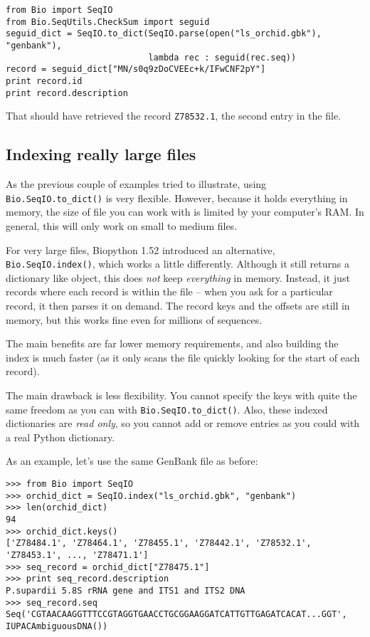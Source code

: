 \documentclass{report}
\begin{document}
\begin{verbatim}
from Bio import SeqIO
from Bio.SeqUtils.CheckSum import seguid
seguid_dict = SeqIO.to_dict(SeqIO.parse(open("ls_orchid.gbk"), "genbank"),
                            lambda rec : seguid(rec.seq))
record = seguid_dict["MN/s0q9zDoCVEEc+k/IFwCNF2pY"]
print record.id
print record.description
\end{verbatim}

\noindent That should have retrieved the record {\tt Z78532.1}, the second entry in the file.

\subsection{Indexing really large files}
\label{sec:seqio-index}

As the previous couple of examples tried to illustrate, using
\verb|Bio.SeqIO.to_dict()| is very flexible. However, because it holds
everything in memory, the size of file you can work with is limited by your
computer's RAM. In general, this will only work on small to medium files.

For very large files, Biopython 1.52 introduced an alternative,
\verb|Bio.SeqIO.index()|, which works a little differently. Although
it still returns a dictionary like object, this does \emph{not} keep
\emph{everything} in memory. Instead, it just records where each record
is within the file -- when you ask for a particular record, it then parses
it on demand. The record keys and the offsets are still in memory, but this
works fine even for millions of sequences.

The main benefits are far lower memory requirements, and also building
the index is much faster (as it only scans the file quickly looking for
the start of each record).

The main drawback is less flexibility. You cannot specify the keys with quite
the same freedom as you can with \verb|Bio.SeqIO.to_dict()|. Also, these
indexed dictionaries are \emph{read only}, so you cannot add or remove
entries as you could with a real Python dictionary.

As an example, let's use the same GenBank file as before:

\begin{verbatim}
>>> from Bio import SeqIO
>>> orchid_dict = SeqIO.index("ls_orchid.gbk", "genbank")
>>> len(orchid_dict)
94
>>> orchid_dict.keys()
['Z78484.1', 'Z78464.1', 'Z78455.1', 'Z78442.1', 'Z78532.1', 'Z78453.1', ..., 'Z78471.1']
>>> seq_record = orchid_dict["Z78475.1"]
>>> print seq_record.description
P.supardii 5.8S rRNA gene and ITS1 and ITS2 DNA
>>> seq_record.seq
Seq('CGTAACAAGGTTTCCGTAGGTGAACCTGCGGAAGGATCATTGTTGAGATCACAT...GGT', IUPACAmbiguousDNA())
\end{verbatim}
\end{document}
